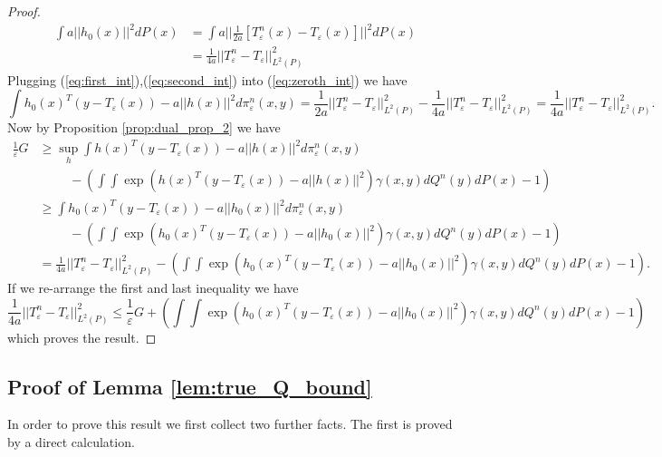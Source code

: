 \documentclass{article}
\theoremstyle{definition}
\newcommand{\Teps}{T_\varepsilon}
\begin{document}
\begin{proof}
\begin{align}
    \int a ||h_0(x)||^2 dP(x) &= \int a ||\frac{1}{2a}[\Teps^n(x) - \Teps(x)]||^2 dP(x) \nonumber \\
    &= \frac{1}{4a} ||\Teps^n - \Teps||_{L^2(P)}^2 \label{eq:second_int}
\end{align}
Plugging (\ref{eq:first_int}),(\ref{eq:second_int}) into (\ref{eq:zeroth_int}) we have
\begin{equation*}
    \int h_0(x)^T(y - \Teps(x)) - a||h(x)||^2 d\pi_\varepsilon^n(x,y) = \frac{1}{2a}||\Teps^n - \Teps||_{L^2(P)}^2 - \frac{1}{4a}||\Teps^n - \Teps||_{L^2(P)}^2 = \frac{1}{4a}||\Teps^n - \Teps||_{L^2(P)}^2. %
\end{equation*}
Now by Proposition \ref{prop:dual_prop_2} we have
\begin{align*}
    \frac{1}{\varepsilon} G 
    &\geq \sup_{h}  \int h(x)^T(y - \Teps(x)) - a||h(x)||^2 d\pi_\varepsilon^n(x,y) \nonumber 
    \\ 
    & \hspace{1cm}-  \left (\int\int \exp\left (h(x)^T(y - \Teps(x)) - a||h(x)||^2 \right )\gamma(x,y) dQ^n(y)dP(x) - 1 \right ) \\
    &\geq \int h_0(x)^T(y - \Teps(x)) - a||h_0(x)||^2 d\pi_\varepsilon^n(x,y) \nonumber 
    \\ 
    & \hspace{1cm}-  \left (\int\int \exp\left (h_0(x)^T(y - \Teps(x)) - a||h_0(x)||^2 \right )\gamma(x,y) dQ^n(y)dP(x) - 1 \right ) \\
    &= \frac{1}{4a}||\Teps^n - \Teps||_{L^2(P)}^2 - \left (\int\int \exp\left (h_0(x)^T(y - \Teps(x)) - a||h_0(x)||^2 \right )\gamma(x,y) dQ^n(y)dP(x) - 1 \right ).
\end{align*}
If we re-arrange the first and last inequality we have
\begin{equation*}
    \frac{1}{4a}||\Teps^n - \Teps||_{L^2(P)}^2 \leq \frac{1}{\varepsilon}G + \left (\int\int \exp\left (h_0(x)^T(y - \Teps(x)) -  a||h_0(x)||^2 \right )\gamma(x,y) dQ^n(y)dP(x) - 1 \right )
\end{equation*}
which proves the result.
\end{proof}

\subsection{Proof of Lemma \ref{lem:true_Q_bound}} 

In order to prove this result we first collect two further facts. The first is proved by a direct calculation.
\end{document}
